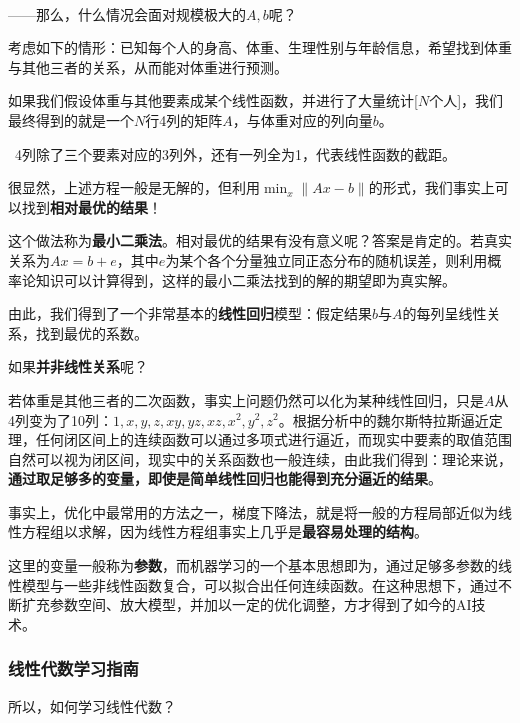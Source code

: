 \documentclass[a4paper,UTF8,fontset=windows]{ctexart}
\newcommand*{\note}{\noindent *}
\begin{document}
\

——那么，什么情况会面对规模极大的$A,b$呢？

考虑如下的情形：已知每个人的身高、体重、生理性别与年龄信息，希望找到体重与其他三者的关系，从而能对体重进行预测。

如果我们假设体重与其他要素成某个线性函数，并进行了大量统计[$N$个人]，我们最终得到的就是一个$N$行4列的矩阵$A$，与体重对应的列向量$b$。

\note \ 4列除了三个要素对应的3列外，还有一列全为1，代表线性函数的截距。

很显然，上述方程一般是无解的，但利用$\min_x\|Ax-b\|$的形式，我们事实上可以找到\textbf{相对最优的结果}！

这个做法称为\textbf{最小二乘法}。相对最优的结果有没有意义呢？答案是肯定的。若真实关系为$Ax=b+e$，其中$e$为某个各个分量独立同正态分布的随机误差，则利用概率论知识可以计算得到，这样的最小二乘法找到的解的期望即为真实解。

由此，我们得到了一个非常基本的\textbf{线性回归}模型：假定结果$b$与$A$的每列呈线性关系，找到最优的系数。

如果\textbf{并非线性关系}呢？

若体重是其他三者的二次函数，事实上问题仍然可以化为某种线性回归，只是$A$从4列变为了10列：$1,x,y,z,xy,yz,xz,x^2,y^2,z^2$。根据分析中的魏尔斯特拉斯逼近定理，任何闭区间上的连续函数可以通过多项式进行逼近，而现实中要素的取值范围自然可以视为闭区间，现实中的关系函数也一般连续，由此我们得到：理论来说，\textbf{通过取足够多的变量，即使是简单线性回归也能得到充分逼近的结果}。

\note 事实上，优化中最常用的方法之一，梯度下降法，就是将一般的方程局部近似为线性方程组以求解，因为线性方程组事实上几乎是\textbf{最容易处理的结构}。

这里的变量一般称为\textbf{参数}，而机器学习的一个基本思想即为，通过足够多参数的线性模型与一些非线性函数复合，可以拟合出任何连续函数。在这种思想下，通过不断扩充参数空间、放大模型，并加以一定的优化调整，方才得到了如今的AI技术。

\subsubsection{线性代数学习指南}
所以，如何学习线性代数？
\end{document}
